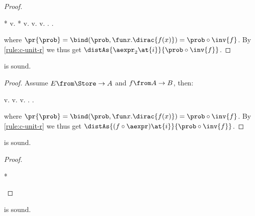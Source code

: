 \begin{proof}
  \begin{eqexplain}
    *
  \whichproves*
    \CC\prob v.
      *
\whichproves
    \CC\prob v.
\whichproves
    \CC\prob v. 
\whichproves
    \CC\prob v.  .
\whichproves
    \CC{\pr{\prob}} .
  \end{eqexplain}
  where $\pr{\prob} = \bind(\prob, \fun x. \dirac{f(x)}) = \prob \circ \inv{f}$.
  By \ref{rule:c-unit-r} we thus get
  $\distAs{\aexpr_2\at{i}}{\prob \circ \inv{f}}$.
\end{proof} \begin{lemma}
\label{proof:dist-fun}
   is sound.
\end{lemma}

\begin{proof}
  Assume $E\from \Store \to A$ and $ f \from A \to B $, then:
  \begin{eqexplain}
\whichproves*
      \CC\prob v. 
\whichproves
      \CC\prob v. 
\whichproves
      \CC\prob v.  .
\whichproves
      \CC{\pr{\prob}} .
  \end{eqexplain}
  where $\pr{\prob} = \bind(\prob, \fun x. \dirac{f(x)}) = \prob \circ \inv{f}$.
  By \ref{rule:c-unit-r} we thus get
  $\distAs{(f\circ\aexpr)\at{i}}{\prob \circ \inv{f}}$.
\end{proof} \begin{lemma}
\label{proof:dirac-dup}
   is sound.
\end{lemma}

\begin{proof}
  \begin{eqexplain}
    \whichproves*
    \whichproves
     \ast {}
    \whichproves
     * 
  \end{eqexplain}
\end{proof} \begin{lemma}
\label{proof:dist-supp}
   is sound.
\end{lemma}

